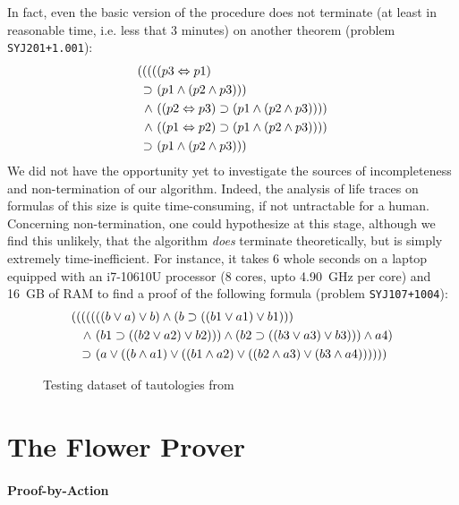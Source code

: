\begin{scope}
In fact, even the basic version of the  procedure does not
terminate (at least in reasonable time, i.e. less that 3 minutes) on another
 theorem (problem \texttt{SYJ201+1.001}):
\begin{align*}
((((&(p3 \Leftrightarrow p1)\\
\supset ~&(p1 \land (p2 \land p3)))\\
\land ~&((p2 \Leftrightarrow p3) \supset (p1 \land (p2 \land p3))))\\
\land ~&((p1 \Leftrightarrow p2) \supset (p1 \land (p2 \land p3))))\\
\supset ~&(p1 \land (p2 \land p3)))
\end{align*}
We did not have the opportunity yet to investigate the sources of incompleteness
and non-termination of our algorithm. Indeed, the analysis of life traces on
formulas of this size is quite time-consuming, if not untractable for a human.
Concerning non-termination, one could hypothesize at this stage, although we
find this unlikely, that the algorithm \emph{does} terminate theoretically, but
is simply extremely time-inefficient. For instance, it takes 6 whole seconds on a laptop
equipped with an i7-10610U processor (8 cores, upto 4.90~GHz per core) and 16~GB
of RAM to find a proof of the following formula (problem \texttt{SYJ107+1004}):
\begin{align*}
  (((((&((b \lor a) \lor b) \land (b \supset ((b1 \lor a1) \lor b1)))\\
  \land ~&(b1 \supset ((b2 \lor a2) \lor b2))) \land (b2 \supset ((b3 \lor a3) \lor b3))) \land a4)\\
  \supset ~&(a \lor ((b \land a1) \lor ((b1 \land a2) \lor ((b2 \land a3) \lor (b3 \land a4))))))
\end{align*}

\begin{figure*}
  
  \caption{Testing dataset of tautologies from }
\end{figure*}

\section{The Flower Prover}

\paragraph{Proof-by-Action}


\end{scope}
